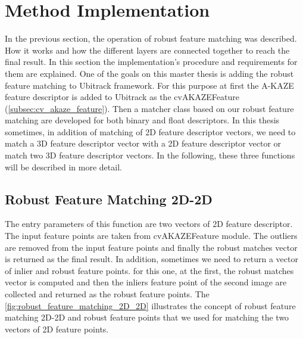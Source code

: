 \section {Method Implementation}
In the previous section, the operation of robust feature matching was described. How it works and how the different layers are connected together to reach the final result. In this section the implementation's procedure and requirements for them are explained. One of the goals on this master thesis is adding the robust feature matching to Ubitrack framework. For this purpose at first the A-KAZE feature descriptor is added to Ubitrack as the cvAKAZEFeature (\autoref{subsec:cv_akaze_feature}). Then a matcher class based on our robust feature matching are developed for both binary and float descriptors. In this thesis sometimes, in addition of matching of 2D feature descriptor vectors, we need to match a 3D feature descriptor vector with a 2D feature descriptor vector or match two 3D feature descriptor vectors. In the following, these three functions will be described in more detail.

\subsection {Robust Feature Matching 2D-2D} \label{subsec:robust_feature_matching_2D_2D}
The entry parameters of this function are two vectors of 2D feature descriptor. The input feature points are taken from cvAKAZEFeature module. The outliers are removed from the input feature points and finally the robust matches vector is returned as the final result. In addition, sometimes we need to return a vector of inlier and robust feature points. for this one, at the first, the robust matches vector is computed and then the inliers feature point of the second image are collected and returned as the robust feature points. The \autoref{fig:robust_feature_matching_2D_2D} illustrates the concept of robust feature matching 2D-2D and robust feature points that we used for matching the two vectors of 2D feature points.


